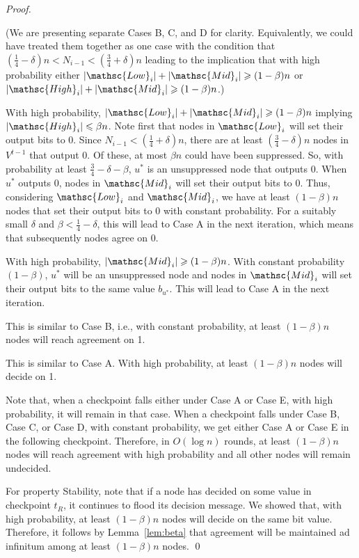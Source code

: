 \documentclass[leqno,11pt]{article}
\renewcommand{\ge}{\geqslant}
\renewcommand{\le}{\leqslant}
\newcommand{\lo}{{\mathsc{Low}}}
\newcommand{\hi}{{\mathsc{High}}}
\renewcommand{\mid}{{\mathsc{Mid}}}
\begin{document}
{\begin{proof}
\begin{description}
  (We are presenting separate Cases B, C, and D for clarity. Equivalently, we could have treated them together as one case with the condition that  $(\frac{1}{4} - \delta)n < N_{i-1} <(\frac{3}{4} + \delta)n$ leading to the implication that with high probability either $|\lo_i| +|\mid_i| \ge (1-\beta)n$ or $|\hi_i| +|\mid_i| \ge (1-\beta)n$.)

	
\item[Case B ($\frac{1}{4} - \delta)n < N_{i-1} < (\frac{1}{4} + \delta) n$):] With high
   probability, $|\lo_i| +|\mid_i| \ge (1-\beta)n$ implying  $|\hi_i| \le
   \beta n$. Note first that nodes in $\lo_i$ will set their output bits to 0.
   Since $N_{i-1} < (\frac{1}{4} + \delta) n$, there are at least $(\frac{3}{4}
   - \delta) n$ nodes
   in $V^{t-1}$ that output 0. Of these, at most $\beta n$ could have been
   suppressed. So, with probability at least $\frac{3}{4} - \delta- \beta$, $u^*$ is an
   unsuppressed node that outputs 0. When $u^*$ outputs 0, nodes in $\mid_i$
   will set their output bits to 0. Thus, considering $\lo_i$ and $\mid_i$, we
   have at least $(1-\beta)n$ nodes that set their output bits to $0$ with
   constant probability. 
For a suitably small $\delta$ and $\beta<\frac{1}{4}-\delta$, this will lead to
Case A in the next iteration, which means that subsequently nodes agree on 0.
	 
   \item[Case C ($(\frac{1}{4} +\delta) n \le N_{i-1} \le (\frac{3}{4} - \delta) n $):]
     With high probability, $|\mid_i| \ge (1-\beta)n$. With constant probability
     $(1-\beta)$, $u^*$ will be an unsuppressed node and nodes in $\mid_i$ will
     set their output bits to the same value $b_{u^*}$. This will  lead to 
     Case A in the next iteration. 

   \item[Case D ($(\frac{3}{4} - \delta)n < N_{i-1} < (\frac{3}{4} + \delta)n$):] 
     This is similar to Case B, i.e., with constant probability, at least $(1-
     \beta)n$  nodes will reach agreement on 1.


   \item[Case E ($N_{i-1} \ge (\frac{3}{4}+\delta)n$):] This is similar to Case A.
     With high probability, at least $(1 - \beta) n$ nodes will decide on 1. 

\end{description}
Note that, when a checkpoint falls either under Case A or Case E, with high
probability, it will remain in that case. When a checkpoint falls under Case B,
Case C, or Case D, with constant probability, we get either Case A or Case E in
the following checkpoint. Therefore, in $O(\log n)$ rounds, at least
$(1-\beta)n$ nodes will reach agreement with high probability and all other
nodes will remain undecided.

For property Stability, note that if a node has decided on some value 
in checkpoint $t_R$, it continues to flood its decision message. We showed that, with high probability, at least
$(1-\beta)n$ nodes will decide on the same bit value. Therefore, it follows by
Lemma~\ref{lem:beta} that agreement will be maintained  ad infinitum among at
least $(1 - \beta) n$ nodes. \qed
\end{proof}
}
\end{document}
